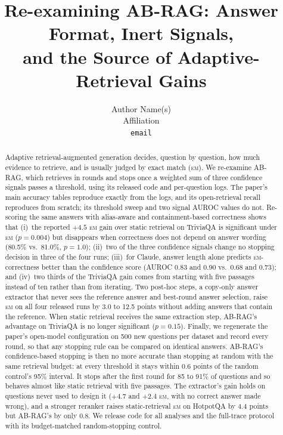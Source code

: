 \documentclass[11pt]{article}
\title{Re-examining AB-RAG: Answer Format, Inert Signals,\\and the Source of Adaptive-Retrieval Gains}
\author{Author Name(s)\\Affiliation\\\texttt{email}}
\date{}
\newcommand{\EM}{\textsc{em}}
\begin{document}
\maketitle

\begin{abstract}
Adaptive retrieval-augmented generation decides, question by question, how much evidence to retrieve, and is usually judged by exact match (\EM{}). We re-examine AB-RAG, which retrieves in rounds and stops once a weighted sum of three confidence signals passes a threshold, using its released code and per-question logs. The paper's main accuracy tables reproduce exactly from the logs, and its open-retrieval recall reproduces from scratch; its threshold sweep and two signal AUROC values do not. Re-scoring the same answers with alias-aware and containment-based correctness shows that (i)~the reported $+4.5$ \EM{} gain over static retrieval on TriviaQA is significant under \EM{} ($p=0.004$) but disappears when correctness does not depend on answer wording (80.5\% vs.\ 81.0\%, $p=1.0$); (ii)~two of the three confidence signals change no stopping decision in three of the four runs; (iii)~for Claude, answer length alone predicts \EM{}-correctness better than the confidence score (AUROC 0.83 and 0.90 vs.\ 0.68 and 0.73); and (iv)~two thirds of the TriviaQA gain comes from starting with five passages instead of ten rather than from iterating. Two post-hoc steps, a copy-only answer extractor that never sees the reference answer and best-round answer selection, raise \EM{} on all four released runs by 3.0 to 12.5 points without adding answers that contain the reference. When static retrieval receives the same extraction step, AB-RAG's advantage on TriviaQA is no longer significant ($p=0.15$). Finally, we regenerate the paper's open-model configuration on 500 new questions per dataset and record every round, so that any stopping rule can be compared on identical answers. AB-RAG's confidence-based stopping is then no more accurate than stopping at random with the same retrieval budget: at every threshold it stays within 0.6 points of the random control's 95\% interval. It stops after the first round for 85 to 91\% of questions and so behaves almost like static retrieval with five passages. The extractor's gain holds on questions never used to design it ($+4.7$ and $+2.4$ \EM{}, with no correct answer made wrong), and a stronger reranker raises static-retrieval \EM{} on HotpotQA by 4.4 points but AB-RAG's by only 0.8. We release code for all analyses and the full-trace protocol with its budget-matched random-stopping control.
\end{abstract}
\end{document}
